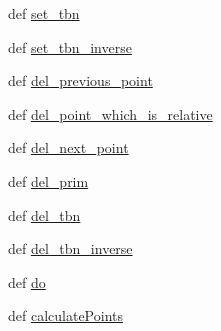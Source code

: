 \begin{DoxyCompactItemize}
\item 
def \hyperlink{classdestruction_1_1_create_t_b_n_1_1_create_t_b_n_aac120d79c09a56e88dba8852539b9144}{set\-\_\-tbn}
\item 
def \hyperlink{classdestruction_1_1_create_t_b_n_1_1_create_t_b_n_a35a29bd5c3e137c7668d99a14bdea521}{set\-\_\-tbn\-\_\-inverse}
\item 
def \hyperlink{classdestruction_1_1_create_t_b_n_1_1_create_t_b_n_a7362464ecfe42265ce053d56259c431a}{del\-\_\-previous\-\_\-point}
\item 
def \hyperlink{classdestruction_1_1_create_t_b_n_1_1_create_t_b_n_a8327869fe9fc5852d0cdfdfc4c152e37}{del\-\_\-point\-\_\-which\-\_\-is\-\_\-relative}
\item 
def \hyperlink{classdestruction_1_1_create_t_b_n_1_1_create_t_b_n_ab8be9ca2c0a7c5431f993e202112f890}{del\-\_\-next\-\_\-point}
\item 
def \hyperlink{classdestruction_1_1_create_t_b_n_1_1_create_t_b_n_adacb5b56206e8270b8eef84ff1fe4959}{del\-\_\-prim}
\item 
def \hyperlink{classdestruction_1_1_create_t_b_n_1_1_create_t_b_n_a183c396862de3c010815c79ff892176c}{del\-\_\-tbn}
\item 
def \hyperlink{classdestruction_1_1_create_t_b_n_1_1_create_t_b_n_a54bc8b5a6d1be6e7f1a98eb08547fbf8}{del\-\_\-tbn\-\_\-inverse}
\item 
def \hyperlink{classdestruction_1_1_create_t_b_n_1_1_create_t_b_n_a97b4627163f1883a17c41494e8505bc4}{do}
\item 
def \hyperlink{classdestruction_1_1_create_t_b_n_1_1_create_t_b_n_ab00fd2d6ae99ec68910d310875647485}{calculate\-Points}
\end{DoxyCompactItemize}
